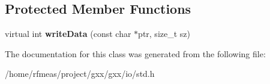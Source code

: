 \subsection*{Protected Member Functions}
\begin{DoxyCompactItemize}
\item 
virtual int {\bfseries write\+Data} (const char $\ast$ptr, size\+\_\+t sz)\hypertarget{classgxx_1_1io_1_1std__string__writer_ab9f4212394c895830f31ad0fad9ebde5}{}\label{classgxx_1_1io_1_1std__string__writer_ab9f4212394c895830f31ad0fad9ebde5}

\end{DoxyCompactItemize}


The documentation for this class was generated from the following file\+:\begin{DoxyCompactItemize}
\item 
/home/rfmeas/project/gxx/gxx/io/std.\+h\end{DoxyCompactItemize}
